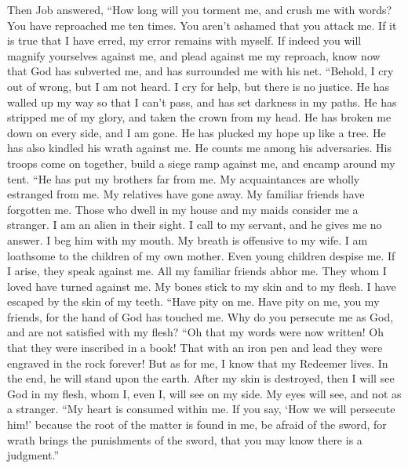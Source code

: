  Then Job answered,  ``How long will you
torment me, and crush me with words?  You have reproached
me ten times. You aren't ashamed that you attack me.  If
it is true that I have erred, my error remains with myself.
 If indeed you will magnify yourselves against me, and
plead against me my reproach,  know now that God has
subverted me, and has surrounded me with his net. 
``Behold, I cry out of wrong, but I am not heard. I cry for help, but
there is no justice.  He has walled up my way so that I
can't pass, and has set darkness in my paths.  He has
stripped me of my glory, and taken the crown from my head.
 He has broken me down on every side, and I am gone. He
has plucked my hope up like a tree.  He has also kindled
his wrath against me. He counts me among his adversaries.
 His troops come on together, build a siege ramp against
me, and encamp around my tent.  ``He has put my brothers
far from me. My acquaintances are wholly estranged from me.
 My relatives have gone away. My familiar friends have
forgotten me.  Those who dwell in my house and my maids
consider me a stranger. I am an alien in their sight.  I
call to my servant, and he gives me no answer. I beg him with my mouth.
 My breath is offensive to my wife. I am loathsome to the
children of my own mother.  Even young children despise
me. If I arise, they speak against me.  All my familiar
friends abhor me. They whom I loved have turned against me.
 My bones stick to my skin and to my flesh. I have
escaped by the skin of my teeth.  ``Have pity on me. Have
pity on me, you my friends, for the hand of God has touched me.
 Why do you persecute me as God, and are not satisfied
with my flesh?  ``Oh that my words were now written! Oh
that they were inscribed in a book!  That with an iron
pen and lead they were engraved in the rock forever!  But
as for me, I know that my Redeemer lives. In the end, he will stand upon
the earth.  After my skin is destroyed, then I will see
God in my flesh,  whom I, even I, will see on my side. My
eyes will see, and not as a stranger. ``My heart is consumed within me.
 If you say, `How we will persecute him!' because the
root of the matter is found in me,  be afraid of the
sword, for wrath brings the punishments of the sword, that you may know
there is a judgment.''

